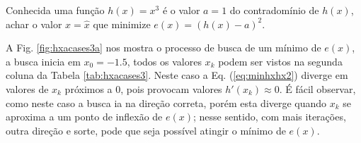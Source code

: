 \begin{example}\label{ex:minhxhx3}
Conhecida uma função $h(x)=x^3$ é o valor $a=1$ do contradomínio de $h(x)$,
achar o valor $x=\hat{x}$ que minimize $e(x)=(h(x)-a)^2$.
\end{example}
\begin{SolutionT}\label{sol:minhxhx3}
 A Fig. \ref{fig:hxacases3a} nos mostra o processo de busca de um mínimo
 de $e(x)$, a busca inicia em $x_0=-1.5$,
 todos os valores $x_{k}$ podem ser vistos na segunda coluna da
Tabela \ref{tab:hxacases3}. Neste caso a Eq. (\ref{eq:minhxhx2}) diverge em 
valores de $x_{k}$ próximos a $0$, pois provocam valores  $h'(x_{k})\approx 0$.
É fácil observar, como neste caso a busca ia na direção correta,
porém esta diverge quando $x_{k}$ se aproxima a um ponto de inflexão de $e(x)$;
nesse sentido, com mais iterações, outra direção e sorte, 
pode que seja possível atingir o mínimo de $e(x)$.
\end{SolutionT}

